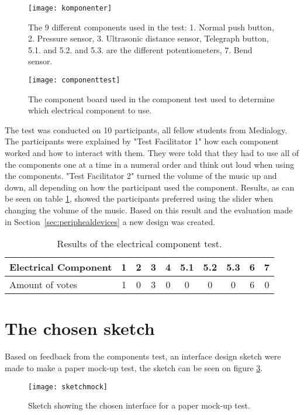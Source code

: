 \begin{figure}[!h] 
\centering
\texttt{[image: komponenter]}
\caption{\label{fig:komponenter} The 9 different components used in the test: 1. Normal push button, 2. Pressure sensor, 3. Ultrasonic distance sensor, Telegraph button, 5.1. and 5.2. and 5.3. are the different potentiometers, 7. Bend sensor.}
\end{figure}

\begin{figure}[!h] 
\centering
\texttt{[image: componenttest]}
\caption{\label{fig:componenttest} The component board used in the component test used to determine which electrical component to use.}
\end{figure}

The test was conducted on 10 participants, all fellow students from Medialogy. The participants were explained by "Test Facilitator 1" how each component worked and how to interact with them. They were told that they had to use all of the components one at a time in a numeral order and think out loud when using the components. "Test Facilitator 2" turned the volume of the music up and down, all depending on how the participant used the component.
Results, as can be seen on table \ref{tab:electritest}, showed the participants preferred using the slider when changing the volume of the music. Based on this result and the evaluation made in Section~\ref{sec:periphealdevices} a new design was created.

\begin{table}[!h]
\centering
\caption{Results of the electrical component test.}
\label{tab:electritest}
\begin{tabular}{|l|c|c|c|c|c|c|c|c|c|}
\hline
Electrical Component & 1 & 2 & 3 & 4 & 5.1 & 5.2 & 5.3 & 6 & 7 \\ \hline
Amount of votes & 1 & 0 & 3 & 0 & 0 & 0 & 0 & 6 & 0 \\ \hline
\end{tabular}
\end{table}


\section{The chosen sketch}\label{sec:thechosensketch}
Based on feedback from the components test, an interface design sketch were made to make a paper mock-up test, the sketch can be seen on figure \ref{fig:sketchmock}. 

\begin{figure}[!h] 
\centering
\texttt{[image: sketchmock]}
\caption{\label{fig:sketchmock} Sketch showing the chosen interface for a paper mock-up test.}
\end{figure}

